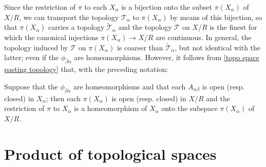 Since the restriction of $\pi$ to each $X_\alpha$ is a bijection onto the subset $\pi(X_\alpha)$ of $X/R$, we can transport the topology $\mathcal{T}_\alpha$ to $\pi(X_\alpha)$ by means of this bijection, so that $\pi(X_\alpha)$ carries a topology $\widetilde{\mathcal{T}}_\alpha$ and the topology $\mathcal{T}$ on $X/R$ is the finest for which the canonical injections $\pi(X_\alpha)\to X/R$ are continuous. In general, the topology induced by $\mathcal{T}$ on $\pi(X_\alpha)$ is coarser than $\widetilde{\mathcal{T}}_\alpha$, but not identical with the latter; even if the $\phi_{\beta\alpha}$ are homeomorphisms. However, it follows from \cref{topo space pasting topology} that, with the preceding notation:
\begin{proposition}
Suppose that the $\phi_{\beta\alpha}$ are homeomorphisms and that each $A_{\alpha\beta}$ is open (resp. closed) in $X_\alpha$; then each $\pi(X_\alpha)$ is open (resp. closed) in $X/R$ and the restriction of $\pi$ to $X_\alpha$ is a homeomorphism of $X_\alpha$ onto the subspace $\pi(X_\alpha)$ of $X/R$.
\end{proposition}
\section{Product of topological spaces}
